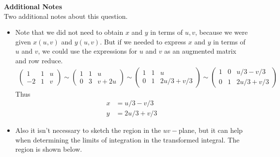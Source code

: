 {    \textbf{Additional Notes}\\
    Two additional notes about this question. 
    \begin{itemize}
        \item Note that we did not need to obtain $x$ and $y$ in terms of $u,v$, because we were given $x(u,v)$ and $y(u,v)$. But if we needed to express $x$ and $y$ in terms of $u$ and $v$, we could use the expressions for $u$ and $v$ as an augmented matrix and row reduce. 
    \begin{align}
        \begin{pmatrix} 1 & 1 & u \\-2 & 1 & v\end{pmatrix} 
        \sim \begin{pmatrix} 1 & 1 & u \\0 & 3 & v + 2u\end{pmatrix} 
        \sim \begin{pmatrix} 1 & 1 & u \\0 & 1 & 2u/3 + v/3\end{pmatrix} 
        \sim \begin{pmatrix} 1 & 0 & u/3-v/3 \\0 & 1 & 2u/3 + v/3\end{pmatrix} 
    \end{align}
    Thus
    \begin{align}
        x &= u/3 - v/3\\
        y &= 2u/3+v/3
    \end{align}
    \item Also it isn't necessary to sketch the region in the $uv-$plane, but it can help when determining the limits of integration in the transformed integral. The region is shown below. 
    \begin{center}     
    \end{center}     
    \end{itemize}
    
    
    }
